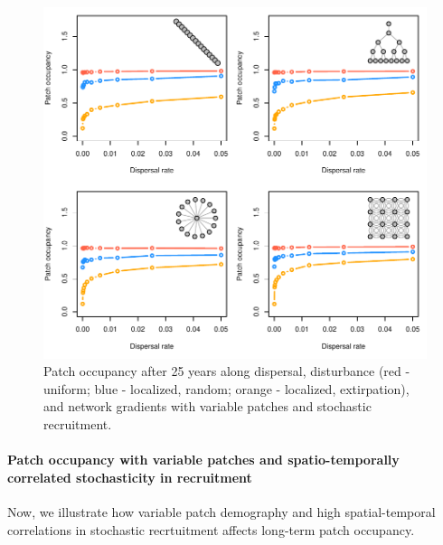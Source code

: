 \documentclass[]{article}
\let\oldparagraph\paragraph
\renewcommand{\paragraph}[1]{\oldparagraph{#1}\mbox{}}
\begin{document}
\begin{figure}[H]

{\centering \includegraphics{Managing_for_ecological_surprises_in_metapopulations_files/figure-latex/patch occupancy with variable patches and stochasticity-1} 

}

\caption{Patch occupancy after 25 years along dispersal, disturbance (red - uniform; blue - localized, random; orange - localized, extirpation), and network gradients with variable patches and stochastic recruitment.}\label{fig:patch occupancy with variable patches and stochasticity}
\end{figure}

\newpage

\hypertarget{patch-occupancy-with-variable-patches-and-spatio-temporally-correlated-stochasticity-in-recruitment}{%
\paragraph{Patch occupancy with variable patches and spatio-temporally
correlated stochasticity in
recruitment}\label{patch-occupancy-with-variable-patches-and-spatio-temporally-correlated-stochasticity-in-recruitment}}

Now, we illustrate how variable patch demography and high
spatial-temporal correlations in stochastic recrtuitment affects
long-term patch occupancy.
\end{document}
